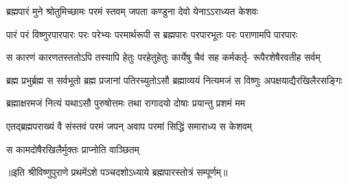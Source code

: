 \begingroup
{}

\addtocounter{shlokacount}{53}

\twolineshloka
{ब्रह्मपारं मुने श्रोतुमिच्छामः परमं स्तवम्}
{जपता कण्डुना देवो येनाऽऽराध्यत केशवः} %

\fourlineindentedshloka
{पारं परं विष्णुरपारपारः}
{परः परेभ्यः परमार्थरूपी}
{स ब्रह्मपारः परपारभूतः}
{परः पराणामपि पारपारः} %

\fourlineindentedshloka
{स कारणं कारणतस्ततोऽपि}
{तस्यापि हेतुः परहेतुहेतुः}
{कार्येषु चैवं सह कर्मकर्तृ-}
{रूपैरशेषैरवतीह सर्वम्} %

\fourlineindentedshloka
{ब्रह्म प्रभुर्ब्रह्म स सर्वभूतो}
{ब्रह्म प्रजानां पतिरच्युतोऽसौ} 
{ब्रह्माव्ययं नित्यमजं स विष्णुः}
{अपक्षयाद्यैरखिलैरसङ्गिः} %

\twolineshloka
{ब्रह्माक्षरमजं नित्यं यथाऽसौ पुरुषोत्तमः}
{तथा रागादयो दोषाः प्रयान्तु प्रशमं मम} %

\twolineshloka
{एतद्ब्रह्मपराख्यं वै संस्तवं परमं जपन्}
{अवाप परमां सिद्धिं समाराध्य स केशवम्} %

{स कामदोषैरखिलैर्मुक्तः प्राप्नोति वाञ्छितम्} %

॥इति श्रीविष्णुपुराणे प्रथमेंऽशे पञ्चदशोऽध्याये ब्रह्मपारस्तोत्रं सम्पूर्णम्॥ 

\endgroup